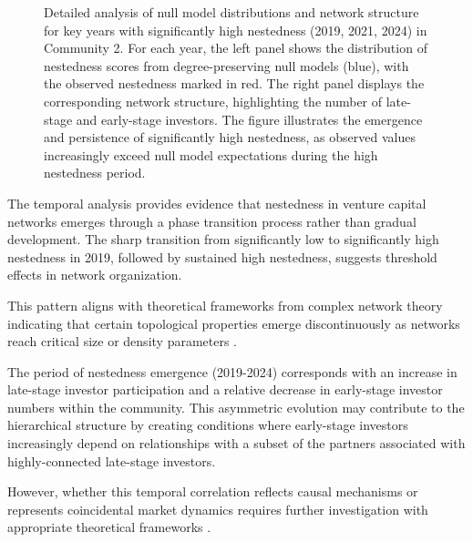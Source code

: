 \begin{figure}[htbp]
\caption{Detailed analysis of null model distributions and network structure for key years with significantly high nestedness (2019, 2021, 2024) in Community 2. For each year, the left panel shows the distribution of nestedness scores from degree-preserving null models (blue), with the observed nestedness marked in red. The right panel displays the corresponding network structure, highlighting the number of late-stage and early-stage investors. The figure illustrates the emergence and persistence of significantly high nestedness, as observed values increasingly exceed null model expectations during the high nestedness period.}
\label{fig:null_model_distributions_significant_years}
\end{figure}

The temporal analysis provides evidence that nestedness in venture capital networks emerges through a phase transition process rather than gradual development. The sharp transition from significantly low to significantly high nestedness in 2019, followed by sustained high nestedness, suggests threshold effects in network organization. 

This pattern aligns with theoretical frameworks from complex network theory indicating that certain topological properties emerge discontinuously as networks reach critical size or density parameters \cite{Mariani2019}.


The period of nestedness emergence (2019-2024) corresponds with an increase in late-stage investor participation and a relative decrease in early-stage investor numbers within the community. This asymmetric evolution may contribute to the hierarchical structure by creating conditions where early-stage investors increasingly depend on relationships with a subset of the partners associated with highly-connected late-stage investors. 


However, whether this temporal correlation reflects causal mechanisms or represents coincidental market dynamics requires further investigation with appropriate theoretical frameworks \cite{Dalle2025}.

